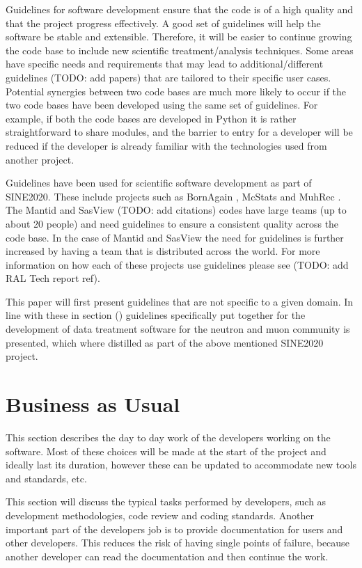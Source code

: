 \documentclass[jnr]{iosart2x}
\begin{document}
Guidelines for software development ensure that the code is of a high quality and that the project progress effectively.
A good set of guidelines will help the software be stable and extensible.
Therefore, it will be easier to continue growing the code base to include new scientific treatment/analysis techniques.
Some areas have specific needs and requirements that may lead to additional/different guidelines \cite{} (TODO: add papers) that are tailored to their specific user cases. Potential synergies between two code bases are much more likely to occur if the two code bases have been developed using the same set of guidelines. For example, if both the code bases are developed in Python it is rather straightforward to share modules, and the barrier to entry for a developer will be reduced if the developer is already familiar with the technologies used from another project. 


Guidelines have been used for scientific software development as part of SINE2020. 
These include projects such as BornAgain \cite{}, McStats \cite{} and MuhRec \cite{}. 
The Mantid \cite{} and SasView \cite{} (TODO: add citations) codes have large teams (up to about 20 people) and need guidelines to ensure a consistent quality across the code base. 
In the case of Mantid and SasView the need for guidelines is further increased by having a team that is distributed across the world. 
For more information on how each of these projects use guidelines please see \cite{} (TODO: add RAL Tech report ref).   

This paper will first present guidelines that are not specific to a given domain.
In line with these in section () guidelines specifically put together for the development of data treatment software for the neutron and muon community is presented, which where distilled as part of the above mentioned SINE2020 project.

\section{Business as Usual}
\label{Business as Usual}

This section describes the day to day work of the developers working on the software.
Most of these choices will be made at the start of the project and ideally last its duration, however these can be updated to accommodate new tools and standards, etc.

This section will discuss the typical tasks performed by developers, such as development methodologies, code review and coding standards.
Another important part of the developers job is to provide documentation for users and other developers.
This reduces the risk of having single points of failure, because another developer can read the documentation and then continue the work.
\end{document}
